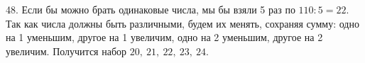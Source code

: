 48. Если бы можно брать одинаковые числа, мы бы взяли 5 раз по $110:5=22.$ Так как числа должны быть различными, будем их менять, сохраняя сумму: одно на 1 уменьшим, другое на 1 увеличим, одно на 2 уменьшим, другое на 2 увеличим. Получится набор $20,\ 21,\ 22,\ 23,\ 24.$\\
